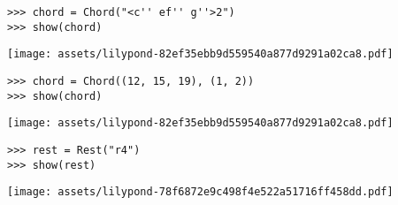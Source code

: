 \begin{comment}
<abjad>
chord = Chord("<c'' ef'' g''>2")
show(chord)
</abjad>
\end{comment}

\begin{abjadbookoutput}
\begin{singlespacing}
\vspace{-0.5\baselineskip}
\begin{lstlisting}
>>> chord = Chord("<c'' ef'' g''>2")
>>> show(chord)
\end{lstlisting}
\noindent\texttt{[image: assets/lilypond-82ef35ebb9d559540a877d9291a02ca8.pdf]}
\end{singlespacing}
\end{abjadbookoutput}

\begin{comment}
<abjad>
chord = Chord((12, 15, 19), (1, 2))
show(chord)
</abjad>
\end{comment}

\begin{abjadbookoutput}
\begin{singlespacing}
\vspace{-0.5\baselineskip}
\begin{lstlisting}
>>> chord = Chord((12, 15, 19), (1, 2))
>>> show(chord)
\end{lstlisting}
\noindent\texttt{[image: assets/lilypond-82ef35ebb9d559540a877d9291a02ca8.pdf]}
\end{singlespacing}
\end{abjadbookoutput}

\begin{comment}
<abjad>
rest = Rest("r4")
show(rest)
</abjad>
\end{comment}

\begin{abjadbookoutput}
\begin{singlespacing}
\vspace{-0.5\baselineskip}
\begin{lstlisting}
>>> rest = Rest("r4")
>>> show(rest)
\end{lstlisting}
\noindent\texttt{[image: assets/lilypond-78f6872e9c498f4e522a51716ff458dd.pdf]}
\end{singlespacing}
\end{abjadbookoutput}

\begin{comment}
<abjad>
rest = Rest((1, 4))
show(rest)
</abjad>
\end{comment}

